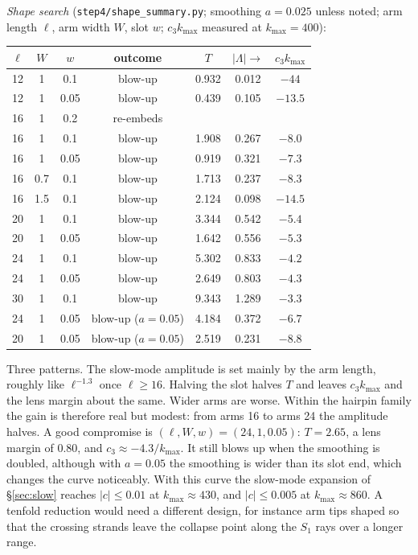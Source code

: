 \documentclass[11pt]{amsart}
\theoremstyle{remark}
\begin{document}
\emph{Shape search} (\texttt{step4/shape\_summary.py}; smoothing $a=0.025$ unless noted; arm length $\ell$, arm width $W$, slot $w$; $c_3k_{\max}$ measured at $k_{\max}=400$):
\begin{center}
\begin{tabular}{@{}ccccccc@{}}
\toprule
$\ell$ & $W$ & $w$ & outcome & $T$ & $|\Lambda|\to$ & $c_3k_{\max}$\\
\midrule
12 & 1 & 0.1 & blow-up & 0.932 & 0.012 & $-44$\\
12 & 1 & 0.05 & blow-up & 0.439 & 0.105 & $-13.5$\\
16 & 1 & 0.2 & re-embeds & & &\\
16 & 1 & 0.1 & blow-up & 1.908 & 0.267 & $-8.0$\\
16 & 1 & 0.05 & blow-up & 0.919 & 0.321 & $-7.3$\\
16 & 0.7 & 0.1 & blow-up & 1.713 & 0.237 & $-8.3$\\
16 & 1.5 & 0.1 & blow-up & 2.124 & 0.098 & $-14.5$\\
20 & 1 & 0.1 & blow-up & 3.344 & 0.542 & $-5.4$\\
20 & 1 & 0.05 & blow-up & 1.642 & 0.556 & $-5.3$\\
24 & 1 & 0.1 & blow-up & 5.302 & 0.833 & $-4.2$\\
24 & 1 & 0.05 & blow-up & 2.649 & 0.803 & $-4.3$\\
30 & 1 & 0.1 & blow-up & 9.343 & 1.289 & $-3.3$\\
\midrule
24 & 1 & 0.05 & blow-up ($a=0.05$) & 4.184 & 0.372 & $-6.7$\\
20 & 1 & 0.05 & blow-up ($a=0.05$) & 2.519 & 0.231 & $-8.8$\\
\bottomrule
\end{tabular}
\end{center}
Three patterns. The slow-mode amplitude is set mainly by the arm length, roughly like $\ell^{-1.3}$ once $\ell\ge16$. Halving the slot halves $T$ and leaves $c_3k_{\max}$ and the lens margin about the same. Wider arms are worse. Within the hairpin family the gain is therefore real but modest: from arms 16 to arms 24 the amplitude halves. A good compromise is $(\ell,W,w)=(24,1,0.05)$: $T=2.65$, a lens margin of $0.80$, and $c_3\approx-4.3/k_{\max}$. It still blows up when the smoothing is doubled, although with $a=0.05$ the smoothing is wider than its slot end, which changes the curve noticeably. With this curve the slow-mode expansion of \S\ref{sec:slow} reaches $|c|\le0.01$ at $k_{\max}\approx430$, and $|c|\le0.005$ at $k_{\max}\approx860$. A tenfold reduction would need a different design, for instance arm tips shaped so that the crossing strands leave the collapse point along the $S_1$ rays over a longer range.
\end{document}
